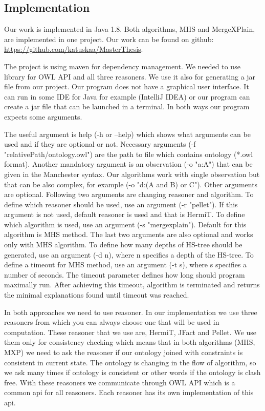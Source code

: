 \documentclass[12pt,a4paper]{article}
\begin{document}
\subsection{Implementation}
Our work is implemented in Java 1.8. Both algorithms, MHS and MergeXPlain, are implemented in one project. Our work can be found on github: \url{https://github.com/katuskaa/MasterThesis}. 

The project is using maven for dependency management. We needed to use library for OWL API and all three reasoners. We use it also for generating a jar file from our project. Our program does not have a graphical user interface. It can run in some IDE for Java for example (IntelliJ IDEA) or our program can create a jar file that can be launched in a terminal. In both ways our program expects some arguments. 

The useful argument is help (-h or --help) which shows what arguments can be used and if they are optional or not. Necessary arguments (-f "relativePath/ontology.owl") are the path to file which contains ontology (*.owl format). Another mandatory argument is an observation (-o "a:A") that can be given in the Manchester syntax. Our algorithms work with single observation but that can be also complex, for example (-o "d:(A and B) or C"). Other arguments are optional. Following two arguments are changing reasoner and algorithm. To define which reasoner should be used, use an argument (-r "pellet"). If this argument is not used, default reasoner is used and that is HermiT. To define which algorithm is used, use an argument (-s "mergexplain"). Default for this algorithm is MHS method. The last two arguments are also optional and works only with MHS algorithm. To define how many depths of HS-tree should be generated, use an argument (-d n), where n specifies a depth of the HS-tree. To define a timeout for MHS method, use an argument (-t s), where s specifies a number of seconds. The timeout parameter defines how long should program maximally run. After achieving this timeout, algorithm is terminated and returns the minimal explanations found until timeout was reached.

In both approaches we need to use reasoner. In our implementation we use three reasoners from which you can always choose one that will be used in computation. These reasoner that we use are, HermiT, JFact and Pellet. We use them only for consistency checking which means that in both algorithms (MHS, MXP) we need to ask the reasoner if our ontology joined with constraints is consistent in current state. The ontology is changing in the flow of algorithm, so we ask many times if ontology is consistent or other words if the ontology is clash free. With these reasoners we communicate through OWL API which is a common api for all reasoners. Each reasoner has its own implementation of this api.
\end{document}
